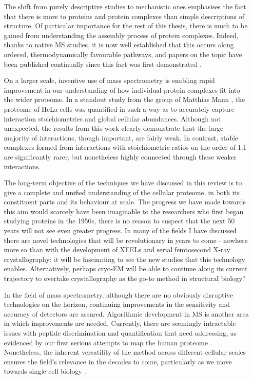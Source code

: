 \documentclass[a4paper,11pt,twoside,openright]{scrbook}
\begin{document}
The shift from purely descriptive studies to mechanistic ones emphasises the
fact that there is more to proteins and protein complexes than simple
descriptions of structure. Of particular importance for the rest of this thesis,
there is much to be gained from understanding the assembly process of protein
complexes. Indeed, thanks to native MS studies, it is now well established that
this occurs along ordered, thermodynamically favourable pathways, and papers on
the topic have been published continually since this fact was first demonstrated
\cite{Levy2008,Marsh2013,Appolaire2014,Macek2017,Mallik2017}.

On a larger scale, inventive use of mass spectrometry is enabling rapid
improvement in our understanding of how individual protein complexes fit into
the wider proteome. In a standout study from the group of Matthias Mann
\cite{Hein2015}, the proteome of HeLa cells was quantified in such a way as to
accurately capture interaction stoichiometries and global cellular abundances.
Although not unexpected, the results from this work clearly demonstrate that the
large majority of interactions, though important, are fairly weak. In contrast,
stable complexes formed from interactions with stoichiometric ratios on the
order of 1:1 are significantly rarer, but nonetheless highly connected through
these weaker interactions.

The long-term objective of the techniques we have discussed in this review is to
give a complete and unified understanding of the cellular proteome, in both its
constituent parts and its behaviour at scale. The progress we have made towards
this aim would scarcely have been imaginable to the researchers who first began
studying proteins in the 1950s, there is no reason to suspect that the next 50
years will not see even greater progress. In many of the fields I have discussed
there are novel technologies that will be revolutionary in years to come -
nowhere more so than with the development of XFELs and serial femtosecond X-ray
crystallography; it will be fascinating to see the new studies that this
technology enables. Alternatively, perhaps cryo-EM will be able to continue
along its current trajectory to overtake crystallography as the go-to method in
structural biology?

In the field of mass spectrometry, although there are no obviously disruptive
technologies on the horizon, continuing improvements in the sensitivity and
accuracy of detectors are assured. Algorithmic development in MS is another area
in which improvements are needed. Currently, there are seemingly intractable
issues with peptide discrimination and quantification that need addressing, as
evidenced by our first serious attempts to map the human proteome
\cite{Kim2014,Wilhelm2014,Ezkurdia2014}. Nonetheless, the inherent versatility
of the method across different cellular scales ensures the field's relevance in
the decades to come, particularly as we move towards single-cell biology
\cite{Macaulay2017}.
\end{document}
